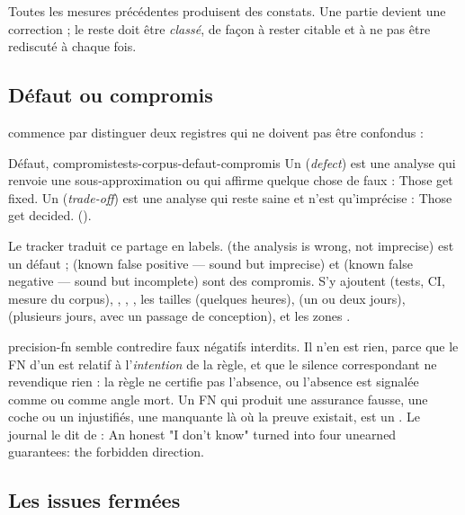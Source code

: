 Toutes les mesures précédentes produisent des constats. Une partie devient une correction ; le reste doit être \emph{classé}, de façon à rester citable et à ne pas être rediscuté à chaque fois.

\subsection{Défaut ou compromis}

 commence par distinguer deux registres qui ne doivent pas être confondus :

\begin{definition}{Défaut, compromis}{tests-corpus-defaut-compromis}
Un  (\emph{defect}) est une analyse qui renvoie une sous-approximation ou qui affirme quelque chose de faux : \og Those get fixed.\fg{} Un  (\emph{trade-off}) est une analyse qui reste saine et n'est qu'imprécise : \og Those get decided.\fg{} ().
\end{definition}

Le tracker traduit ce partage en labels.  (\og the analysis is wrong, not imprecise\fg{}) est un défaut ;  (\og known false positive — sound but imprecise\fg{}) et  (\og known false negative — sound but incomplete\fg{}) sont des compromis. S'y ajoutent  (tests, CI, mesure du corpus), , , , les tailles  (quelques heures),  (un ou deux jours),  (plusieurs jours, avec un passage de conception), et les zones .

\begin{piege}
\og precision-fn\fg{} semble contredire \og faux négatifs interdits\fg{}. Il n'en est rien, parce que le FN d'un  est relatif à l'\emph{intention} de la règle, et que le silence correspondant ne revendique rien : la règle ne certifie pas l'absence, ou l'absence est signalée comme  ou comme angle mort. Un FN qui produit une assurance fausse, une coche ou un  injustifiés, une \Error{} manquante là où la preuve existait, est un . Le journal le dit de  : \og An honest "I don't know" turned into four unearned guarantees: the forbidden direction\fg{}.
\end{piege}

\subsection{Les issues fermées }

